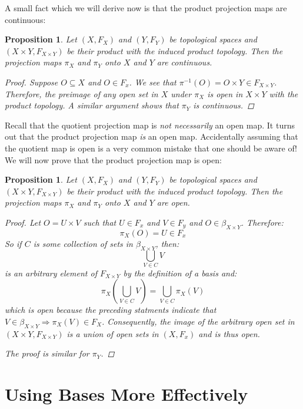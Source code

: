 \documentclass[reqno]{amsart}
\newcommand{\inv}{^{-1}}
\newtheorem{proposition}[theorem]{Proposition}
\begin{document}
A small fact which we will derive now is that the product projection maps are continuous:
\begin{proposition}
Let $(X,F_X)$ and $(Y,F_Y)$ be topological spaces and $(X\times Y,F_{X\times Y})$ be their product with the induced product topology. Then the projection maps $\pi_X$ and $\pi_Y$ onto $X$ and $Y$ are continuous. 

\begin{proof}
Suppose $O\subseteq X$ and $O\in F_x$. We see that $\pi\inv(O) = O\times Y \in F_{X\times Y}$. Therefore, the preimage of any open set in $X$ under $\pi_X$ is open in $X\times Y$ with the product topology. A similar argument shows that $\pi_Y$ is continuous. 
\end{proof}
\end{proposition}

Recall that the quotient projection map is \emph{not necessarily} an open map. It turns out that the product projection map \emph{is} an open map. Accidentally assuming that the quotient map is open is a very common mistake that one should be aware of! We will now prove that the product projection map is open:
\begin{proposition}
Let $(X,F_X)$ and $(Y,F_Y)$ be topological spaces and $(X\times Y,F_{X\times Y})$ be their product with the induced product topology. Then the projection maps $\pi_X$ and $\pi_Y$ onto $X$ and $Y$ are open.

\begin{proof}
Let $O = U\times V$ such that $U \in F_x$ and $V\in F_y$ and $O\in \beta_{X\times Y}$. Therefore:
\[\pi_X(O) = U\in F_x\]
So if $C$ is some collection of sets in $\beta_{X\times Y}$, then:
\[\bigcup_{V\in C}V\]
is an arbitrary element of $F_{X\times Y}$ by the definition of a basis and:
\[\pi_X\left( \bigcup_{V\in C}V \right) = \bigcup_{V\in C} \pi_X(V)\]
which is open because the preceding statments indicate that $V\in \beta_{X\times Y} \Rightarrow \pi_X(V)\in F_X$. Consequently, the image of the arbitrary open set in $(X\times Y, F_{X\times Y})$ is a union of open sets in $(X,F_x)$ and is thus open.

The proof is similar for $\pi_Y$. 
\end{proof}
\end{proposition}

\section{Using Bases More Effectively}
\end{document}
